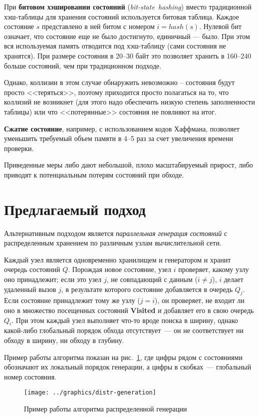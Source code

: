 \documentclass[12pt,a4paper,fleqn]{article}
\newcommand{\Code}[1]{\textbf{\mbox{#1}}}
\newcommand{\Term}[1]{\emph{\mbox{#1}}}
\begin{document}
При \textbf{битовом хэшировании состояний} (\Term{bit-state hashing}) вместо традиционной
хэш-таблицы для хранения состояний используется битовая таблица. Каждое состояние $s$
представлено в ней битом с номером $i = hash(s)$. Нулевой бит означает, что состояние еще
не было достигнуто, единичный — было. При этом вся используемая память отводится под
хэш-таблицу (сами состояния не хранятся). При размере состояния в 20--30 байт это позволяет
хранить в 160--240 больше состояний, чем при традиционном подходе.

Однако, коллизии в этом случае обнаружить невозможно -- состояния будут просто
<<теряться>>, поэтому приходится просто полагаться на то, что коллизий не возникнет (для
этого надо обеспечить низкую степень заполненности таблицы) или что <<потерянные>>
состояния не повлияют на итог.

\textbf{Сжатие состояние}, например, с использованием кодов Хаффмана, позволяет уменьшить требуемый
объем памяти в 4--5 раз за счет увеличения времени проверки.

Приведенные меры либо дают небольшой, плохо масштабируемый прирост, либо приводят к потенциальным потерям
состояний при обходе.

\section{Предлагаемый подход}

Альтернативным подходом является \emph{параллельная генерация состояний} с распределенным хранением
по различным узлам вычислительной сети.

Каждый узел является одновременно хранилищем и генератором и хранит очередь состояний
$Q$. Порождая новое состояние, узел $i$ проверяет, какому узлу оно принадлежит; если это
узел $j$, не совпадающий с данным ($i \neq j$), $i$ делает удаленный вызов $j$, в
результате которого состояние добавляется в очередь $Q_j$. Если состояние принадлежит тому
же узлу ($j = i$), он проверяет, не входит ли оно в множество посещенных состояний
\Code{Visited} и добавляет его в свою очередь $Q_i$. При этом каждый узел выполняет что-то
вроде поиска в ширину, однако какой-либо глобальный порядок обхода отсутствует~--- он не
соответствует ни обходу в ширину, ни обходу в глубину.

Пример работы алгоритма показан на рис.~\ref{fig:distr-generation}, где цифры рядом с
состояниями обозначают их локальный порядок генерации, а цифры в скобках~--- глобальный
номер состояния.

\begin{figure}[!htb]
  \centering
  \texttt{[image: ../graphics/distr-generation]}
  \caption{Пример работы алгоритма распределенной генерации}
  \label{fig:distr-generation}
\end{figure}
\end{document}
